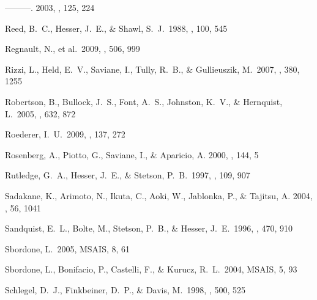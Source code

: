 \documentclass{emulateapj}
\begin{document}
\begin{thebibliography}{}
 ---------. 2003, \aj, 125,
  224


 Reed, B.~C., Hesser, J.~E., \&
  Shawl, S.~J.\ 1988, \pasp, 100, 545

 Regnault, N., et al.\ 2009,
  \aap, 506, 999

 Rizzi, L., Held, E.~V., Saviane,
  I., Tully, R.~B., \& Gullieuszik, M.\ 2007, \mnras, 380, 1255

 Robertson, B., Bullock, J.~S.,
  Font, A.~S., Johnston, K.~V., \& Hernquist, L.\ 2005, \apj, 632, 872

 Roederer, I.~U.\ 2009, \aj, 137, 272

 Rosenberg, A., Piotto, G.,
  Saviane, I., \& Aparicio, A. 2000, \aaps, 144, 5

 Rutledge, G.~A., Hesser, J.~E.,
  \& Stetson, P.~B.\ 1997, \pasp, 109, 907

 Sadakane, K., Arimoto, N.,
  Ikuta, C., Aoki, W., Jablonka, P., \& Tajitsu, A. 2004, \pasj, 56,
  1041

 Sandquist, E.~L., Bolte, M.,
  Stetson, P.~B., \& Hesser, J.~E.\ 1996, \apj, 470, 910




 Sbordone, L.\ 2005, MSAIS, 8, 61

 Sbordone, L., Bonifacio, P.,
  Castelli, F., \& Kurucz, R.~L.\ 2004, MSAIS, 5, 93

 Schlegel, D.~J., Finkbeiner,
  D.~P., \& Davis, M.\ 1998, \apj, 500, 525



\end{thebibliography}
\end{document}
